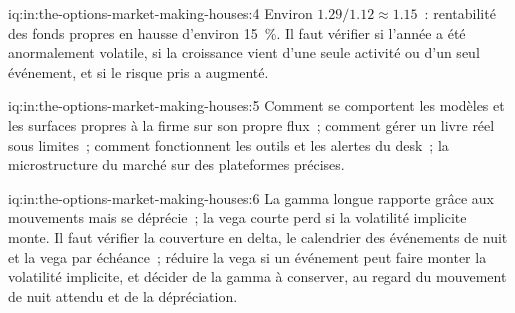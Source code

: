 \begin{solution}{iq:in:the-options-market-making-houses:4}
Environ $1.29/1.12\approx1.15$~: rentabilité des fonds propres en hausse d'environ 15~\%. Il faut vérifier si l'année a été
anormalement volatile, si la croissance vient d'une seule activité ou d'un seul événement, et si le risque pris a augmenté.
\end{solution}

\begin{solution}{iq:in:the-options-market-making-houses:5}
Comment se comportent les modèles et les surfaces propres à la firme sur son propre flux~; comment gérer un livre réel sous limites~; comment
fonctionnent les outils et les alertes du desk~; la microstructure du marché sur des plateformes précises.
\end{solution}

\begin{solution}{iq:in:the-options-market-making-houses:6}
La gamma longue rapporte grâce aux mouvements mais se déprécie~; la vega courte perd si la volatilité implicite monte. Il faut vérifier la couverture en delta, le
calendrier des événements de nuit et la vega par échéance~; réduire la vega si un événement peut faire monter la volatilité implicite, et
décider de la gamma à conserver, au regard du mouvement de nuit attendu et de la dépréciation.
\end{solution}
